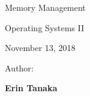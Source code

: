 \begin{titlepage}
\label{titlepage}
    \begin{singlespace}
		\hfill  
        \par\vspace{.2in}
        \centering
        \scshape{
            \vspace{.3in}
            \Huge{Memory Management}\par  
            \vspace{.3in}
            \large Operating Systems II\par
            \vspace{.1in}
            \large November 13, 2018\par
            \vspace{.5in}
            \Large Author:\par\vspace{.1in} 
            \textbf{\LARGE Erin Tanaka}\par\vspace{.07in} 
            \vspace{1.4in}
            \par
        }
    \end{singlespace}
            

\end{titlepage}
